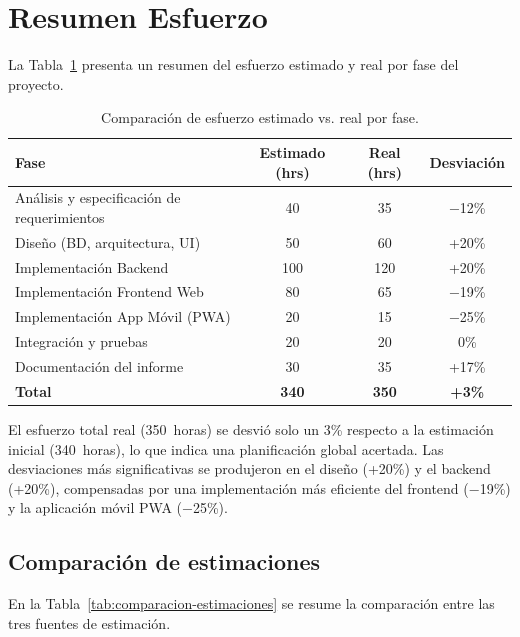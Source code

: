 \section{Resumen Esfuerzo}

La Tabla~\ref{tab:esfuerzo} presenta un resumen del esfuerzo estimado y real por fase del proyecto.

\begin{table}[H]
\centering
\begin{tabular}{|p{}|c|c|c|}
\hline
\textbf{Fase} & \textbf{Estimado (hrs)} & \textbf{Real (hrs)} & \textbf{Desviación} \\ \hline
Análisis y especificación de requerimientos & 40 & 35 & $-$12\% \\ \hline
Diseño (BD, arquitectura, UI) & 50 & 60 & +20\% \\ \hline
Implementación Backend & 100 & 120 & +20\% \\ \hline
Implementación Frontend Web & 80 & 65 & $-$19\% \\ \hline
Implementación App Móvil (PWA) & 20 & 15 & $-$25\% \\ \hline
Integración y pruebas & 20 & 20 & 0\% \\ \hline
Documentación del informe & 30 & 35 & +17\% \\ \hline
\textbf{Total} & \textbf{340} & \textbf{350} & \textbf{+3\%} \\ \hline
\end{tabular}
\caption{Comparación de esfuerzo estimado vs. real por fase.}
\label{tab:esfuerzo}
\end{table}

El esfuerzo total real (350~horas) se desvió solo un 3\% respecto a la estimación inicial (340~horas), lo que indica una planificación global acertada. Las desviaciones más significativas se produjeron en el diseño (+20\%) y el backend (+20\%), compensadas por una implementación más eficiente del frontend ($-$19\%) y la aplicación móvil PWA ($-$25\%).

\subsection{Comparación de estimaciones}

En la Tabla~\ref{tab:comparacion-estimaciones} se resume la comparación entre las tres fuentes de estimación.

